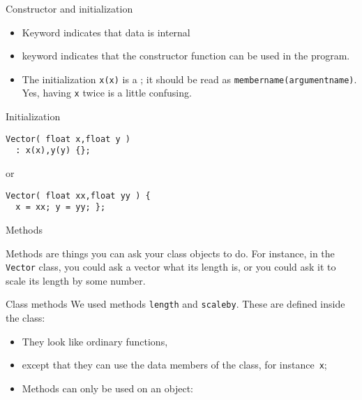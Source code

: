 \begin{block}{Constructor and initialization}
  \begin{itemize}
  \item Keyword  indicates that data is internal
  \item keyword  indicates that the constructor
    function can be used in the program.
  \item The initialization \lstinline{x(x)} is a
    ; it should be read as
    \lstinline{membername(argumentname)}.
    Yes, having \lstinline{x} twice is a little confusing.
  \end{itemize}
\end{block}

\begin{block}{Initialization}
  \label{sl:init-no-list}
\begin{lstlisting}
Vector( float x,float y )
  : x(x),y(y) {};
\end{lstlisting}
or
\begin{lstlisting}
Vector( float xx,float yy ) {
  x = xx; y = yy; };
\end{lstlisting}
\end{block}

\begin{comment}
  Above you had a declaration \lstinline{Vector v} which was not just a
  declaration: it called the so-called \indextermsub{default}{constructor},
  which has no arguments, and does nothing.
\end{comment}

 {Methods}

Methods are things you can ask your class objects to do. For instance,
in the \lstinline{Vector} class, you could ask a vector what its length is,
or you could ask it to scale its length by some number.

\begin{block}{Class methods}
  \label{sl:method-define}
  We used methods \lstinline{length} and \lstinline{scaleby}. These are defined inside the
  class:
  \begin{itemize}
  \item They look like ordinary functions,
  \item except that they can use the data members of the class, for
    instance~\lstinline{x};
  \item Methods can only be used on an object:
  \end{itemize}
\end{block}

